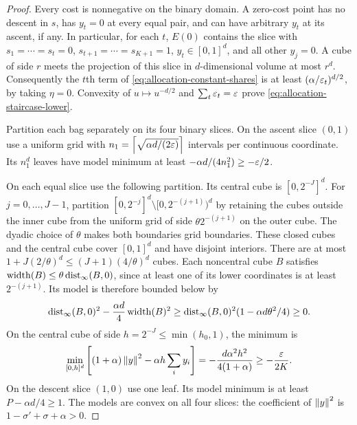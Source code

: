 \begin{proof}
Every cost is nonnegative on the binary domain. A zero-cost point has no
descent in $s$, has $y_t=0$ at every equal pair, and can have arbitrary
$y_t$ at its ascent, if any. In particular, for each $t$, $E(0)$ contains
the slice with $s_1=\cdots=s_t=0$, $s_{t+1}=\cdots=s_{K+1}=1$,
$y_t\in[0,1]^d$, and all other $y_j=0$. A cube of side $r$ meets the
projection of this slice in $d$-dimensional volume at most $r^d$.
Consequently the $t$th term of \eqref{eq:allocation-constant-shares} is
at least $(\alpha/\varepsilon_t)^{d/2}$, by taking $\eta=0$. Convexity of
$u\mapsto u^{-d/2}$ and $\sum_t\varepsilon_t=\varepsilon$ prove
\eqref{eq:allocation-staircase-lower}.

Partition each bag separately on its four binary slices. On the ascent
slice $(0,1)$ use a uniform grid with
$n_1=\left\lceil \sqrt{\alpha d/(2\varepsilon)}\right\rceil$ intervals per continuous coordinate.
Its $n_1^d$ leaves have model minimum at least
$-\alpha d/(4n_1^2)\ge-\varepsilon/2$.

On each equal slice use the following partition. Its central cube is
$[0,2^{-J}]^d$. For $j=0,\ldots,J-1$, partition
$[0,2^{-j}]^d\setminus[0,2^{-(j+1)})^d$ by retaining the cubes outside
the inner cube from the uniform grid of side
$\theta2^{-(j+1)}$ on the outer cube. The dyadic choice of $\theta$
makes both boundaries grid boundaries. These closed cubes and the central
cube cover $[0,1]^d$ and have disjoint interiors. There are at most
$1+J(2/\theta)^d\le(J+1)(4/\theta)^d$ cubes. Each noncentral cube $B$
satisfies
$\operatorname{width}(B)\le\theta\operatorname{dist}_\infty(B,0)$, since at least one of its lower
coordinates is at least $2^{-(j+1)}$. Its model is therefore bounded below
by
\[
 \operatorname{dist}_\infty(B,0)^2-\frac{\alpha d}{4}\operatorname{width}(B)^2
 \ge\operatorname{dist}_\infty(B,0)^2(1-\alpha d\theta^2/4)\ge0.
\]
On the central cube of side $h=2^{-J}\le\min(h_0,1)$, the minimum is
\[
 \min_{[0,h]^d}\left[(1+\alpha)\left\lVert y\right\rVert^2-
                          \alpha h\sum_i y_i\right]
 =-\frac{d\alpha^2h^2}{4(1+\alpha)}\ge-\frac{\varepsilon}{2K}.
\]
On the descent slice $(1,0)$ use one leaf. Its model minimum is at least
$P-\alpha d/4\ge1$. The models are convex on all four slices: the
coefficient of $\left\lVert y\right\rVert^2$ is $1-\sigma'+\sigma+\alpha>0$.


\end{proof}
